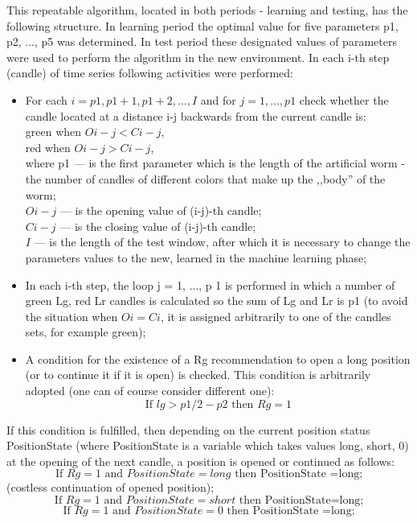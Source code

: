 \documentclass[runningheads,a4paper]{llncs}
\begin{document}
This repeatable algorithm, located in both periods - learning and testing, has the following structure. In learning period the optimal value for five parameters p1, p2, ..., p5 was determined. In test period these designated values of parameters were used to perform the algorithm in the new environment. In each i-th step (candle) of time series following activities were performed:
\begin{itemize}
\item For each $i = p1, p1 +1, p1 +2, ..., I$ and for $j = 1, ..., p1$ check whether the candle located at a distance i-j backwards from the current candle is:\\
green when $Oi-j <Ci-j$, \\
red when $Oi-j> Ci-j$, \\
where p1 --- is the first parameter which is the length of the artificial worm - the number of candles of different colors that make up the ,,body'' of the worm; \\
$Oi-j$ --- is the opening value of (i-j)-th candle;\\ 
$Ci-j$ --- is the closing value of (i-j)-th candle; \\
$I$ --- is the length of the test window, after which it is necessary to change the parameters values to the new, learned in the machine learning phase;\\
\item In each i-th step, the loop j = 1, ..., p 1 is performed in which a number of green Lg, red Lr candles is calculated so the sum of  Lg and Lr is p1 (to avoid the situation when $Oi = Ci$, it is assigned arbitrarily to one of the candles sets, for example green);
\item A condition for the existence of a Rg recommendation to open a long position (or to continue it if it is open) is checked. This condition is arbitrarily adopted (one can of course consider different one): 
\begin{equation}
\text{If } lg> p1/2-p2 \text{ then } Rg=1
\end{equation}  
                                                     
\end{itemize}
If this condition is fulfilled, then depending on the current position status PositionState (where PositionState is a variable which takes values {long, short, 0}) at the opening of the next candle, a position is opened or continued as follows: 
\begin{equation}
\text{If } Rg=1 \text{ and } PositionState =long \text{ then PositionState =long;}
\end{equation}
(costless continuation of opened position);
\begin{equation}
\text{If } Rg=1 \text{ and } PositionState = short \text{ then PositionState=long;}
\end{equation}
\begin{equation}
\text{If } Rg=1 \text{ and } PositionState =0 \text{ then PositionState =long;}
\end{equation}
\end{document}
